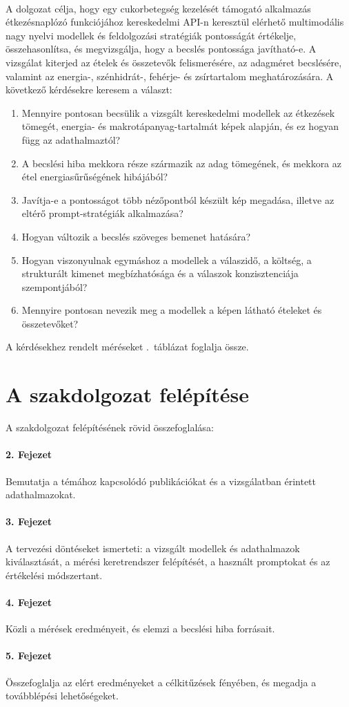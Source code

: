 \paragraph{}A dolgozat célja, hogy egy cukorbetegség kezelését támogató alkalmazás
étkezésnaplózó funkciójához kereskedelmi API-n keresztül elérhető multimodális nagy nyelvi modellek és
feldolgozási stratégiák pontosságát értékelje, összehasonlítsa, és megvizsgálja,
hogy a becslés pontossága javítható-e. A vizsgálat kiterjed az ételek és
összetevők
felismerésére, az adagméret becslésére, valamint az energia-, szénhidrát-,
fehérje- és zsírtartalom meghatározására.
A következő kérdésekre keresem a választ:
\begin{enumerate}
    \item Mennyire pontosan becsülik a vizsgált kereskedelmi modellek az étkezések
    tömegét, energia- és makrotápanyag-tartalmát képek alapján, és ez hogyan függ az
    adathalmaztól?
    \item A becslési hiba mekkora része származik az adag tömegének, és mekkora az
    étel energiasűrűségének hibájából?
    \item Javítja-e a pontosságot több nézőpontból készült kép megadása, illetve az
    eltérő prompt-stratégiák alkalmazása?
    \item Hogyan változik a becslés szöveges bemenet hatására?
    \item Hogyan viszonyulnak egymáshoz a modellek a válaszidő, a költség, a strukturált
    kimenet megbízhatósága és a válaszok konzisztenciája szempontjából?
    \item Mennyire pontosan nevezik meg a modellek a képen látható ételeket és összetevőket?
\end{enumerate}
A kérdésekhez rendelt méréseket \az{\ref{tab:kerdes_meres}}.~táblázat foglalja össze.

\section{A szakdolgozat felépítése}
A szakdolgozat felépítésének rövid összefoglalása:

\paragraph{2. Fejezet}Bemutatja a témához kapcsolódó publikációkat
és a vizsgálatban érintett adathalmazokat.

\paragraph{3. Fejezet}A tervezési döntéseket ismerteti: a vizsgált modellek és
adathalmazok kiválasztását, a mérési keretrendszer felépítését, a használt
promptokat és az értékelési módszertant.

\paragraph{4. Fejezet}Közli a mérések eredményeit, és elemzi a becslési hiba forrásait.

\paragraph{5. Fejezet}Összefoglalja az elért eredményeket a célkitűzések
fényében, és megadja a továbblépési lehetőségeket.
\clearpage %